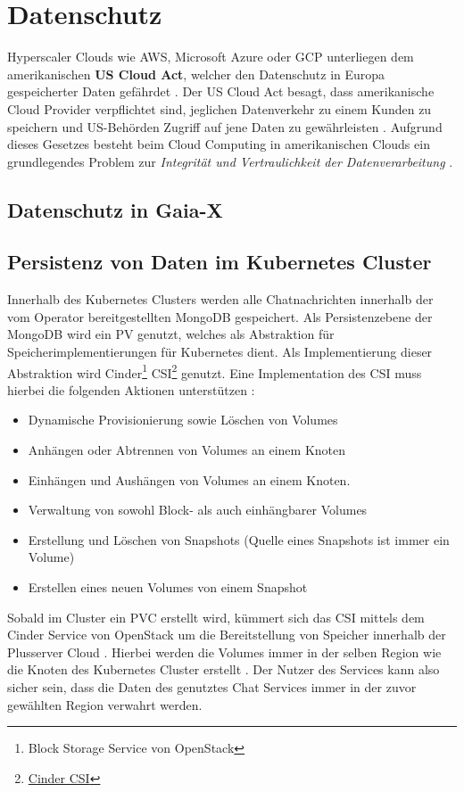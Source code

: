 \chapter{Datenschutz}
\label{chapter:datenschutz}
Hyperscaler Clouds wie \ac{AWS}, Microsoft Azure oder \ac{GCP} unterliegen dem amerikanischen \textbf{US Cloud Act}, welcher
den Datenschutz in Europa gespeicherter Daten gefährdet \cite{Kagermann2021}. Der US Cloud Act besagt,
dass amerikanische Cloud Provider verpflichtet sind, jeglichen Datenverkehr zu einem Kunden zu speichern und 
US-Behörden Zugriff auf jene Daten zu gewährleisten \cite{CloudAct2018}.
Aufgrund dieses Gesetzes besteht beim Cloud Computing in amerikanischen Clouds ein grundlegendes Problem 
zur \emph{Integrität und Vertraulichkeit der Datenverarbeitung} \cite{Weichert2010}.


\section{Datenschutz in Gaia-X}
\label{subsec:datenschutz:gaia-x}

\section{Persistenz von Daten im Kubernetes Cluster}
\label{subsec:datenschutz:persistenz}
Innerhalb des Kubernetes Clusters werden alle Chatnachrichten innerhalb der vom Operator bereitgestellten MongoDB gespeichert.
Als Persistenzebene der MongoDB wird ein \ac{PV} genutzt,
welches als Abstraktion für Speicherimplementierungen für Kubernetes dient.
Als Implementierung dieser Abstraktion wird 
Cinder\footnote{Block Storage Service von OpenStack} \ac{CSI}\footnote{\href{https://github.com/kubernetes/cloud-provider-openstack/tree/master/pkg/csi/cinder}{Cinder CSI}} genutzt. 
Eine Implementation des \ac{CSI} muss hierbei die folgenden Aktionen unterstützen \cite{container-storage-interface_2021}:
\begin{itemize}
  \item Dynamische Provisionierung sowie Löschen von Volumes
  \item Anhängen oder Abtrennen von Volumes an einem Knoten
  \item Einhängen und Aushängen von Volumes an einem Knoten.
  \item Verwaltung von sowohl Block- als auch einhängbarer Volumes
  \item Erstellung und Löschen von Snapshots (Quelle eines Snapshots ist immer ein Volume)
  \item Erstellen eines neuen Volumes von einem Snapshot
\end{itemize}

Sobald im Cluster ein \ac{PVC} erstellt wird, kümmert sich das \ac{CSI} mittels dem Cinder Service von OpenStack 
um die Bereitstellung von Speicher innerhalb der Plusserver Cloud \cite{cinderCSI}.
Hierbei werden die Volumes immer in der selben Region wie die Knoten des Kubernetes Cluster erstellt \cite{kubernetesVolumes}.
Der Nutzer des Services kann also sicher sein, dass die Daten des genutztes Chat Services immer in der zuvor 
gewählten Region verwahrt werden.